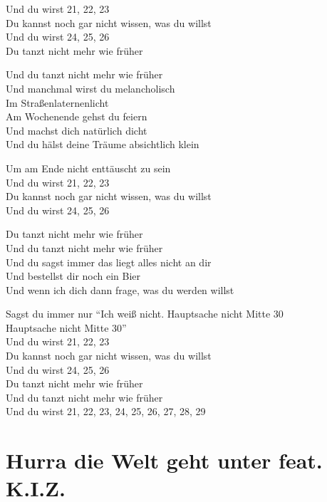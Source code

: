 \documentclass[]{book}
\begin{document}
Und du wirst 21, 22, 23\\
Du kannst noch gar nicht wissen, was du willst\\
Und du wirst 24, 25, 26\\
Du tanzt nicht mehr wie früher

Und du tanzt nicht mehr wie früher\\
Und manchmal wirst du melancholisch\\
Im Straßenlaternenlicht\\
Am Wochenende gehst du feiern\\
Und machst dich natürlich dicht\\
Und du hälst deine Träume absichtlich klein

Um am Ende nicht enttäuscht zu sein\\
Und du wirst 21, 22, 23\\
Du kannst noch gar nicht wissen, was du willst\\
Und du wirst 24, 25, 26

Du tanzt nicht mehr wie früher\\
Und du tanzt nicht mehr wie früher\\
Und du sagst immer das liegt alles nicht an dir\\
Und bestellst dir noch ein Bier\\
Und wenn ich dich dann frage, was du werden willst

Sagst du immer nur ``Ich weiß nicht. Hauptsache nicht Mitte 30\\
Hauptsache nicht Mitte 30''\\
Und du wirst 21, 22, 23\\
Du kannst noch gar nicht wissen, was du willst\\
Und du wirst 24, 25, 26\\
Du tanzt nicht mehr wie früher\\
Und du tanzt nicht mehr wie früher\\
Und du wirst 21, 22, 23, 24, 25, 26, 27, 28, 29

\hypertarget{hurra-die-welt-geht-unter-feat.-k.i.z.}{%
\section{Hurra die Welt geht unter feat. K.I.Z.}\label{hurra-die-welt-geht-unter-feat.-k.i.z.}}
\end{document}
